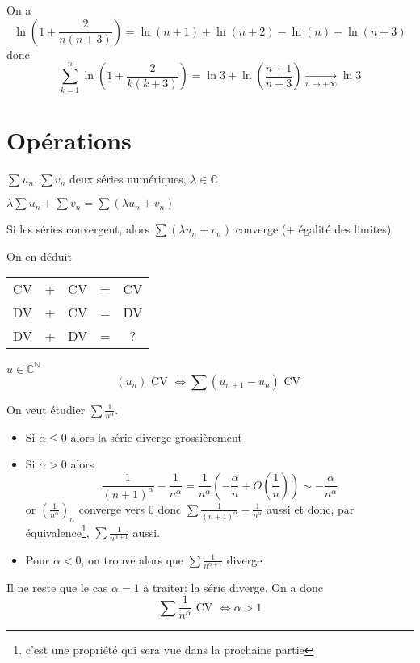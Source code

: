 \begin{ex}
    On a \[
        \ln \left( 1+\frac2{n(n+3)} \right)=\ln(n+1)+\ln(n+2)-\ln(n)-\ln(n+3)
    \]
    donc \[
        \sum_{k=1}^n\ln \left( 1+\frac2{k(k+3)} \right) =\ln3+\ln \left( \frac{n+1}{n+3} \right)\xrightarrow[n\to+\infty]{}\ln 3
    \]
\end{ex}

\needspace{5cm}
\section{Opérations}

\begin{prop}
    \Hyp $\sum u_n, \sum v_n$ deux séries numériques, $\lambda\in\mathbb C$
    \begin{concenum}
    \item $\lambda\sum u_n+\sum v_n=\sum(\lambda u_n+v_n)$
    \item Si les séries convergent, alors $\sum(\lambda u_n+v_n)$ converge (+ égalité des limites)
    \end{concenum}
\end{prop}

\begin{rem}
    On en déduit
    \begin{center}
    \begin{tabular}{ccccc}
        CV & + & CV & = & CV\\
        DV & + & CV & = & DV\\
        DV & + & DV & = & ?
    \end{tabular}
    \end{center}
\end{rem}

\begin{prop}
    \Hyp $u\in\mathbb C^{\mathbb N}$
    \Conc \[
        (u_n)\text{ CV }\iff \sum (u_{n+1}-u_n)\text{ CV }
    \]
\end{prop}

\begin{ex}
    On veut étudier $\sum\frac1{n^\alpha}$.
    \begin{itemize}
        \item Si $\alpha\leq0$ alors la série diverge grossièrement
        \item Si $\alpha> 0$ alors \[
                \frac1{(n+1)^\alpha}-\frac1{n^\alpha}=\frac1{n^\alpha} \left( -\frac\alpha n+O \left( \frac1n \right) \right)\sim -\frac\alpha{n^\alpha}
            \]
            or $(\frac1{n^{\alpha}})_n$ converge vers $0$ donc $\sum \frac1{(n+1)^\alpha}-\frac1{n^\alpha}$ aussi et donc, par équivalence\footnote{c'est une propriété qui sera vue dans la prochaine partie}, $\sum\frac1{n^{\alpha+1}}$ aussi.

        \item Pour $\alpha<0$, on trouve alors que $\sum\frac1{n^{\alpha+1}}$ diverge
    \end{itemize}
    Il ne reste que le cas $\alpha=1$ à traiter: la série diverge. On a donc \[
    \sum\frac1{n^\alpha}\text{ CV }\iff \alpha>1
\]
\end{ex}

